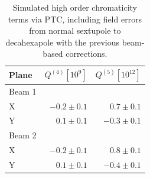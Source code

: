 \begin{table}[!htb]
    \centering
    \begin{tabular}{lrr}
    \toprule
        Plane     &  $Q^{(4)} [10^9]$  &  $Q^{(5)} [10^{12}]$ \\
    \midrule
        Beam 1    &              &               \\
        \hspace{2mm}X         & $-0.2 \pm 0.1$ & $ 0.7 \pm 0.1$ \\
        \hspace{2mm}Y         & $ 0.1 \pm 0.1$ & $-0.3 \pm 0.1$  \\
        Beam 2    &  &   \\
        \hspace{2mm}X         & $-0.2 \pm 0.1$ & $ 0.8 \pm 0.1$  \\
        \hspace{2mm}Y         & $ 0.1 \pm 0.1$ & $-0.4 \pm 0.1$ \\
    \bottomrule
    \end{tabular}
    \caption{Simulated high order chromaticity terms via PTC, including field errors from normal
    sextupole to decahexapole with the previous beam-based corrections.}
    \label{ptc_values}
  \end{table}

